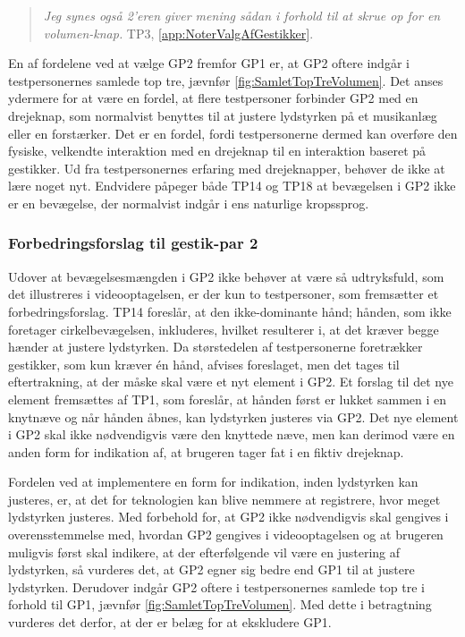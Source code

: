 % 
%
\begin{quotation}
	\noindent
	\textit{Jeg synes også 2'eren giver mening sådan i forhold til at skrue op for en volumen-knap.} TP3, \autoref{app:NoterValgAfGestikker}.
\noindent
\end{quotation}
%
En af fordelene ved at vælge GP2 fremfor GP1 er, at GP2 oftere indgår i testpersonernes samlede top tre, jævnfør \autoref{fig:SamletTopTreVolumen}. Det anses ydermere for at være en fordel, at flere testpersoner forbinder GP2 med en drejeknap, som normalvist benyttes til at justere lydstyrken på et musikanlæg eller en forstærker. Det er en fordel, fordi testpersonerne dermed kan overføre den fysiske, velkendte interaktion med en drejeknap til en interaktion baseret på gestikker. Ud fra testpersonernes erfaring med drejeknapper, behøver de ikke at lære noget nyt. Endvidere påpeger både TP14 og TP18 at bevægelsen i GP2 ikke er en bevægelse, der normalvist indgår i ens naturlige kropssprog. 
%
\subsubsection{Forbedringsforslag til gestik-par 2}
\label{TestresultaterValgAfGestikkerForbedringGP2Volumen}
%
Udover at bevægelsesmængden i GP2 ikke behøver at være så udtryksfuld, som det illustreres i videooptagelsen, er der kun to testpersoner, som fremsætter et forbedringsforslag. TP14 foreslår, at den ikke-dominante hånd; hånden, som ikke foretager cirkelbevægelsen, inkluderes, hvilket resulterer i, at det kræver begge hænder at justere lydstyrken. Da størstedelen af testpersonerne foretrækker gestikker, som kun kræver én hånd, afvises foreslaget, men det tages til eftertrakning, at der måske skal være et nyt element i GP2. Et forslag til det nye element fremsættes af TP1, som foreslår, at hånden først er lukket sammen i en knytnæve og når hånden åbnes, kan lydstyrken justeres via GP2. Det nye element i GP2 skal ikke nødvendigvis være den knyttede næve, men kan derimod være en anden form for indikation af, at brugeren tager fat i en fiktiv drejeknap. 

Fordelen ved at implementere en form for indikation, inden lydstyrken kan justeres, er, at det for teknologien kan blive nemmere at registrere, hvor meget lydstyrken justeres.\blankline
%    
Med forbehold for, at GP2 ikke nødvendigvis skal gengives i overensstemmelse med, hvordan GP2 gengives i videooptagelsen og at brugeren muligvis først skal indikere, at der efterfølgende vil være en justering af lydstyrken, så vurderes det, at GP2 egner sig bedre end GP1 til at justere lydstyrken. Derudover indgår GP2 oftere i testpersonernes samlede top tre i forhold til GP1, jævnfør \autoref{fig:SamletTopTreVolumen}. Med dette i betragtning vurderes det derfor, at der er belæg for at ekskludere GP1. 
%
